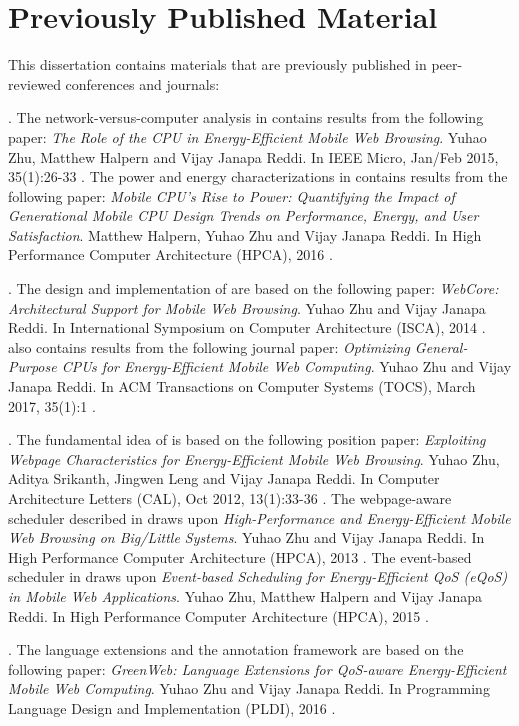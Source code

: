 \section{Previously Published Material}
\label{sec:intro:prev}

This dissertation contains materials that are previously published in peer-reviewed conferences and journals:

\textbf{}. The network-versus-computer analysis in  contains results from the following paper: \textit{The Role of the CPU in Energy-Efficient Mobile Web Browsing}. Yuhao Zhu, Matthew Halpern and Vijay Janapa Reddi. In IEEE Micro, Jan/Feb 2015, 35(1):26-33 \cite{zhu2015role}. The power and energy characterizations in  contains results from the following paper: \textit{Mobile CPU's Rise to Power: Quantifying the Impact of Generational Mobile CPU Design Trends on Performance, Energy, and User Satisfaction}. Matthew Halpern, Yuhao Zhu and Vijay Janapa Reddi. In High Performance Computer Architecture (HPCA), 2016 \cite{mobilecpu}.

\textbf{}. The design and implementation of \webcore are based on the following paper: \textit{WebCore: Architectural Support for Mobile Web Browsing}. Yuhao Zhu and Vijay Janapa Reddi. In International Symposium on Computer Architecture (ISCA), 2014 \cite{webcore}.  also contains results from the following journal paper: \textit{Optimizing General-Purpose CPUs for Energy-Efficient Mobile Web Computing}. Yuhao Zhu and Vijay Janapa Reddi. In ACM Transactions on Computer Systems (TOCS), March 2017, 35(1):1 \cite{webcore-tocs}.

\textbf{}. The fundamental idea of \webrt is based on the following position paper:  \textit{Exploiting Webpage Characteristics for Energy-Efficient Mobile Web Browsing}. Yuhao Zhu, Aditya Srikanth, Jingwen Leng and Vijay Janapa Reddi. In Computer Architecture Letters (CAL), Oct 2012, 13(1):33-36 \cite{zhu2014exploiting}. The webpage-aware scheduler described in  draws upon \textit{High-Performance and Energy-Efficient Mobile Web Browsing on Big/Little Systems}. Yuhao Zhu and Vijay Janapa Reddi.  In High Performance Computer Architecture (HPCA), 2013 \cite{big-little}. The event-based scheduler in  draws upon \textit{Event-based Scheduling for Energy-Efficient QoS (eQoS) in Mobile Web Applications}. Yuhao Zhu, Matthew Halpern and Vijay Janapa Reddi. In High Performance Computer Architecture (HPCA), 2015 \cite{ebs}.

\textbf{}. The \greenweb language extensions and the \autogreen annotation framework are based on the following paper: \textit{GreenWeb: Language Extensions for QoS-aware Energy-Efficient Mobile Web Computing}. Yuhao Zhu and Vijay Janapa Reddi. In Programming Language Design and Implementation (PLDI), 2016 \cite{greenweb}.


